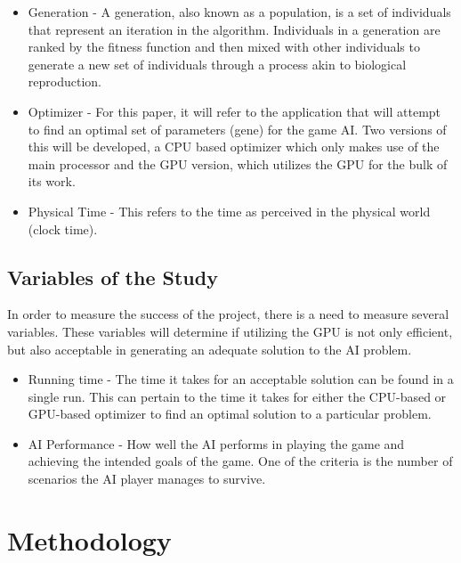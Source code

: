 \documentclass{acm_proc_article-sp}
\begin{document}
\begin{itemize}
 \item Generation - A generation, also known as a population, is a set of individuals that represent
an iteration in the algorithm. Individuals in a generation are ranked by the fitness function and then
mixed with other individuals to generate a new set of individuals through a process akin to biological
reproduction.

  \item Optimizer - For this paper, it will refer to the application that will attempt to find an
optimal set of parameters (gene) for the game AI. Two versions of this will be developed, a CPU
based optimizer which only makes use of the main processor and the GPU version, which utilizes
the GPU for the bulk of its work.

  \item Physical Time - This refers to the time as perceived in the physical world
(clock time).

\end{itemize}

\subsection{Variables of the Study}

In order to measure the success of the project, there is a need to measure several variables. These
variables will determine if utilizing the GPU is not only efficient, but also acceptable in generating
an adequate solution to the AI problem.

\begin{itemize}
 \item Running time - The time it takes for an acceptable solution can be found in a single run.
This can pertain to the time it takes for either the CPU-based or GPU-based optimizer to find an
optimal solution to a particular problem.

 \item AI Performance - How well the AI performs in playing the game and achieving the intended goals
of the game. One of the criteria is the number of scenarios the AI player manages to survive.
\end{itemize}

\section{Methodology}
%
%
\end{document}
